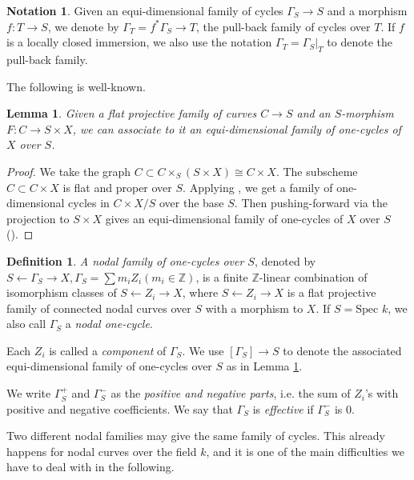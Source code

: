 \documentclass{amsart}
\newtheorem{lem}[theorem]{Lemma}
\theoremstyle{definition}
\newtheorem{defn}[theorem]{Definition}
\newtheorem{notat}[theorem]{Notation}
\theoremstyle{remark}
\newcommand{\mbb}{\mathbb}
\newcommand{\ZZ}{\mbb{Z}}
\newcommand{\SP}{\text{Spec }}
\begin{document}
\begin{notat}
    Given an equi-dimensional family of cycles $\Gamma_S \to S$ and a morphism $f: T \to S$, we denote by $\Gamma_T=f^*\Gamma_S \to T$, the pull-back family of cycles over $T$. 
If $f$ is a locally closed immersion, we also use the notation $\Gamma_T=\Gamma_S|_T$ to denote the pull-back family.
\end{notat}





The following is well-known. 
\begin{lem}\label{lem:hilb_Chow}
    Given a flat projective family of curves $C \to S$ and an $S$-morphism $F: C\to S\times X$, we can associate to it an equi-dimensional family of one-cycles of $X$ over $S$. 
\end{lem}
\begin{proof}
    We take the graph $C \subset C\times_S(S \times X)\cong C\times X$.
    The subscheme $C \subset C \times X$ is flat and proper over $S$. Applying \cite[Corollary 3.2.5]{SV_Chow_Sheaves}, we get a family of one-dimensional cycles in $C \times X/S$ over the base $S$. Then pushing-forward via the projection to $S\times X$ gives an equi-dimensional family of one-cycles of $X$ over $S$ (\cite[Corollary 3.6.3]{SV_Chow_Sheaves}).
\end{proof}
\begin{defn}\label{def:nodal}
\emph{A nodal family of one-cycles over $S$}, denoted by $S \leftarrow\Gamma_S \to X, \Gamma_S =\sum m_i Z_i (m_i\in \ZZ)$, is a finite $\ZZ$-linear combination of isomorphism classes of $S \leftarrow Z_i \to X$, where $S \leftarrow Z_i \to X$ is a flat projective family of connected nodal curves over $S$ with a morphism to $X$.
If $S=\SP k$, we also call $\Gamma_S$ a \emph{nodal one-cycle}.

Each $Z_i$ is called a \emph{component} of $\Gamma_S$.
We use $[\Gamma_S]\to S$ to denote the associated equi-dimensional family of one-cycles over $S$ as in Lemma \ref{lem:hilb_Chow}.

We write $\Gamma_S^+$ and $\Gamma_S^-$ as the \emph{positive and negative parts}, i.e. the sum of $Z_i$'s with positive and negative coefficients. 
We say that $\Gamma_S$ is \emph{effective} if $\Gamma_S^-$ is $0$.
\end{defn}
Two different nodal families may give the same family of cycles.
This already happens for nodal curves over the field $k$,
and it is one of the main difficulties we have to deal with in the following.
\end{document}
